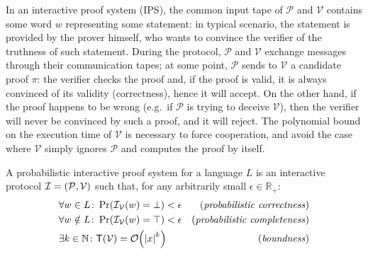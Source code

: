 In an interactive proof system (IPS), the common input tape of \(\mathcal{P}\) and \(\mathcal{V}\)
contains some word \(w\) representing some statement: in typical scenario, the statement is 
provided by the prover himself, who wants to convince the verifier of the truthness of such 
statement.
During the protocol, \(\mathcal{P}\) and \(\mathcal{V}\) exchange messages through their 
communication tapes; at some point, \(\mathcal{P}\) sends to \(\mathcal{V}\) a candidate proof 
\(\pi \): the verifier checks the proof and, if the proof is valid, it is always convinced of its 
validity (correctness), hence it will accept. 
On the other hand, if the proof happens to be wrong (e.g.\ if \(\mathcal{P}\) is trying to deceive
\(\mathcal{V}\)), then the verifier will never be convinced by such a proof, and it will reject.
The polynomial bound on the execution time of \(\mathcal{V}\) is necessary to force cooperation, 
and avoid the case where \(\mathcal{V}\) simply ignores \(\mathcal{P}\) and computes the proof by 
itself.
\begin{definition}  
  A probabilistic interactive proof system for a language \(L\) is an interactive protocol 
  \(\mathcal{I} = \left(\mathcal{P}, \mathcal{V}\right)\) such that, for any arbitrarily small 
  \(\epsilon \in \mathbb{R}_{+}\):
  \begin{align*}
    & \forall w \in L\colon \call{\Pr}{\call{\mathcal{I}_{\mathcal{V}}}{w} = \bot} < \epsilon  & 
      \textnormal{(\emph{probabilistic correctness})} \\
    & \forall w \notin L\colon \call{\Pr}{\call{\mathcal{I}_{\mathcal{V}}}{w} = \top} < \epsilon & 
      \textnormal{(\emph{probabilistic completeness})} \\
    & \exists k \in \mathbb{N}\colon \call{\Time}{\mathcal{V}} = \BigO{\abs{x}^k} & 
    \textnormal{(\emph{boundness})}
  \end{align*}
\end{definition}
